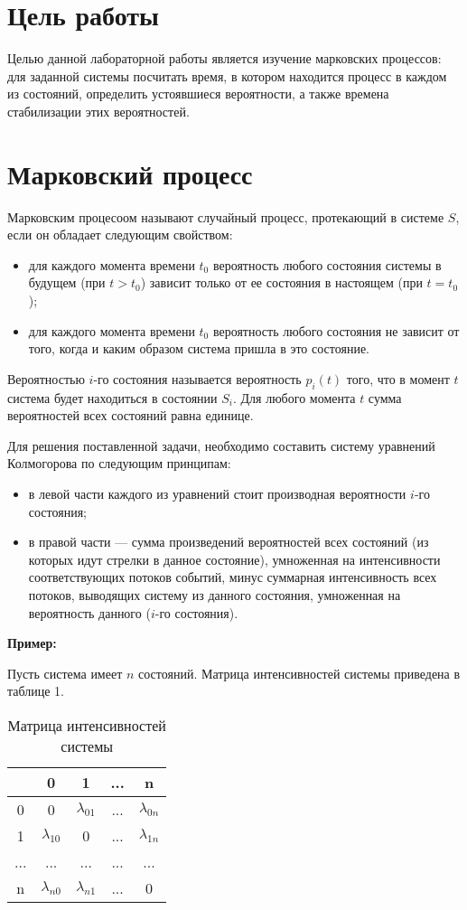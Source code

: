 
\section*{Цель работы}
Целью данной лабораторной работы является изучение марковских процессов: для заданной системы посчитать время, в котором находится процесс в каждом из состояний, определить устоявшиеся вероятности, а также времена стабилизации этих вероятностей.



\section*{Марковский процесс}
Марковским процесоом называют случайный процесс, протекающий в системе $S$, если он обладает следующим свойством: 
\begin{itemize}
	\item для каждого момента времени $t_0$ вероятность любого состояния системы в будущем (при $t > t_0$) зависит только от ее состояния в настоящем (при $t = t_0$);
	\item для каждого момента времени $t_0$ вероятность любого состояния не зависит от того, когда и каким образом система пришла в это состояние.
\end{itemize}
Вероятностью $i$-го состояния называется вероятность $p_i(t)$ того, что в момент $t$ система будет находиться в состоянии $S_i$. Для любого момента $t$ сумма вероятностей всех состояний равна единице.

Для решения поставленной задачи, необходимо составить систему уравнений Колмогорова по следующим принципам:
\begin{itemize}
	\item в левой части каждого из уравнений стоит производная вероятности $i$-го состояния;
	\item в правой части — сумма произведений вероятностей всех состояний (из которых идут стрелки в данное состояние), умноженная на интенсивности соответствующих потоков событий, минус суммарная интенсивность всех потоков, выводящих систему из данного состояния, умноженная на вероятность данного ($i$-го состояния).
\end{itemize}

\textbf{Пример:}

Пусть система имеет $n$ состояний. Матрица интенсивностей системы приведена в таблице 1.

\begin{table}[h!]
	\centering
	\caption{Матрица интенсивностей системы}
	\begin{tabular}{|c c c c c|} 
		\hline
		 & 0 & 1 & ... & n \\ [0.5ex] 
		\hline
		0 & 0 & $\lambda_{01}$ & ... & $\lambda_{0n}$ \\ [0.5ex] 
		\hline
		1 & $\lambda_{10}$ & 0 & ... & $\lambda_{1n}$ \\ [0.5ex] 
		\hline
		... & ... & ... & ... & ... \\ [0.5ex] 
		\hline
		n & $\lambda_{n0}$ & $\lambda_{n1}$ & ... & 0 \\ [0.5ex] 
		\hline
	\end{tabular}
\end{table}


